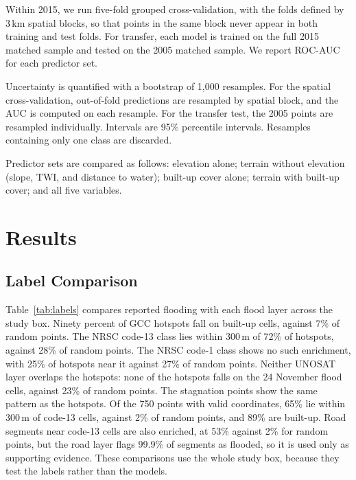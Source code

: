 \documentclass[conference]{IEEEtran}
\begin{document}
Within 2015, we run five-fold grouped cross-validation, with the folds defined by 3\,km spatial blocks, so that points in the same block never appear in both training and test folds. For transfer, each model is trained on the full 2015 matched sample and tested on the 2005 matched sample. We report ROC-AUC for each predictor set.

Uncertainty is quantified with a bootstrap of 1,000 resamples. For the spatial cross-validation, out-of-fold predictions are resampled by spatial block, and the AUC is computed on each resample. For the transfer test, the 2005 points are resampled individually. Intervals are 95\% percentile intervals. Resamples containing only one class are discarded.

Predictor sets are compared as follows: elevation alone; terrain without elevation (slope, TWI, and distance to water); built-up cover alone; terrain with built-up cover; and all five variables.

\section{Results}\label{sec:results}

\subsection{Label Comparison}
Table~\ref{tab:labels} compares reported flooding with each flood layer across the study box. Ninety percent of GCC hotspots fall on built-up cells, against 7\% of random points. The NRSC code-13 class lies within 300\,m of 72\% of hotspots, against 28\% of random points. The NRSC code-1 class shows no such enrichment, with 25\% of hotspots near it against 27\% of random points. Neither UNOSAT layer overlaps the hotspots: none of the hotspots falls on the 24 November flood cells, against 23\% of random points. The stagnation points show the same pattern as the hotspots. Of the 750 points with valid coordinates, 65\% lie within 300\,m of code-13 cells, against 2\% of random points, and 89\% are built-up. Road segments near code-13 cells are also enriched, at 53\% against 2\% for random points, but the road layer flags 99.9\% of segments as flooded, so it is used only as supporting evidence. These comparisons use the whole study box, because they test the labels rather than the models.
\end{document}
